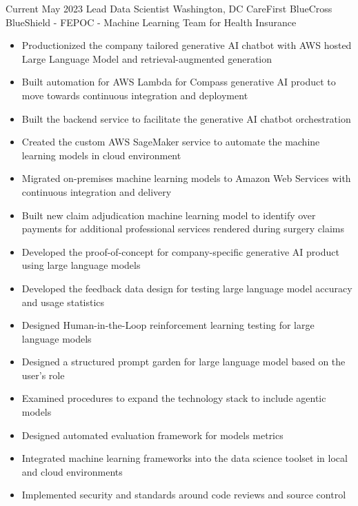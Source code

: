 
\ProjectExperienceTwoSection
{Current}
{May 2023}
{Lead Data Scientist}
{Washington, DC}
{CareFirst BlueCross BlueShield - FEPOC - Machine Learning Team for Health
Insurance}
{
    \begin{itemize}
        \item Productionized the company tailored generative AI chatbot with AWS
        hosted Large Language Model and retrieval-augmented generation
        \item Built automation for AWS Lambda for Compass generative AI
        product to move towards continuous integration and deployment
        \item Built the backend service to facilitate the generative AI
        chatbot orchestration
        \item Created the custom AWS SageMaker service to automate the machine
        learning models in cloud environment
        \item Migrated on-premises machine learning models to Amazon Web
        Services with continuous integration and delivery
        \item Built new claim adjudication machine learning model to identify
        over payments for additional professional services rendered during
        surgery claims
    \end{itemize}
}
{
    \begin{itemize}
        \item Developed the proof-of-concept for company-specific generative
        AI product using large language models
        \item Developed the feedback data design for testing large language
        model accuracy and usage statistics
        \item Designed Human-in-the-Loop reinforcement learning testing for
        large language models
        \item Designed a structured prompt garden for large language model
        based on the user's role
        \item Examined procedures to expand the technology stack to include
        agentic models
        \item Designed automated evaluation framework for models metrics
        \item Integrated machine learning frameworks into the data science
        toolset in local and cloud environments
        \item Implemented security and standards around code reviews and source
        control
    \end{itemize}
}
